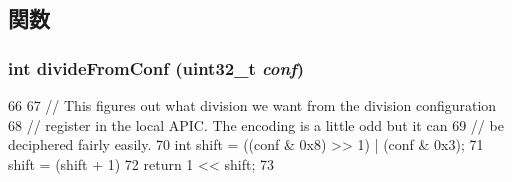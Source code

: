 \subsection{関数}
\hypertarget{x86_2interrupts_8hh_a849c576f20c815c41bcb63318035ab93}{
\subsubsection[{divideFromConf}]{\setlength{\rightskip}{0pt plus 5cm}int divideFromConf ({\bf uint32\_\-t} {\em conf})}}
\label{x86_2interrupts_8hh_a849c576f20c815c41bcb63318035ab93}



\begin{DoxyCode}
66 {
67     // This figures out what division we want from the division configuration
68     // register in the local APIC. The encoding is a little odd but it can
69     // be deciphered fairly easily.
70     int shift = ((conf & 0x8) >> 1) | (conf & 0x3);
71     shift = (shift + 1) %
72     return 1 << shift;
73 }
\end{DoxyCode}
